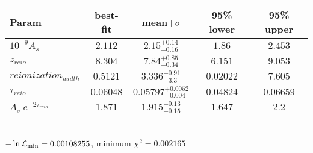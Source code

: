 \begin{tabular}{|l|c|c|c|c|} 
 \hline 
Param & best-fit & mean$\pm\sigma$ & 95\% lower & 95\% upper \\ \hline 
$10^{+9}A_{s }$ &$2.112$ & $2.15_{-0.16}^{+0.14}$ & $1.86$ & $2.453$ \\ 
$z_{reio }$ &$8.304$ & $7.84_{-0.34}^{+0.85}$ & $6.151$ & $9.053$ \\ 
$reionization_{width }$ &$0.5121$ & $3.336_{-3.3}^{+0.91}$ & $0.02022$ & $7.605$ \\ 
$\tau{}_{reio }$ &$0.06048$ & $0.05797_{-0.004}^{+0.0052}$ & $0.04824$ & $0.06659$ \\ 
$A_s \; e^{-2 \tau_{reio}}$ &$1.871$ & $1.915_{-0.15}^{+0.13}$ & $1.647$ & $2.2$ \\ 
\hline 
 \end{tabular} \\ 
$-\ln{\cal L}_\mathrm{min} =0.00108255$, minimum $\chi^2=0.002165$ \\ 
